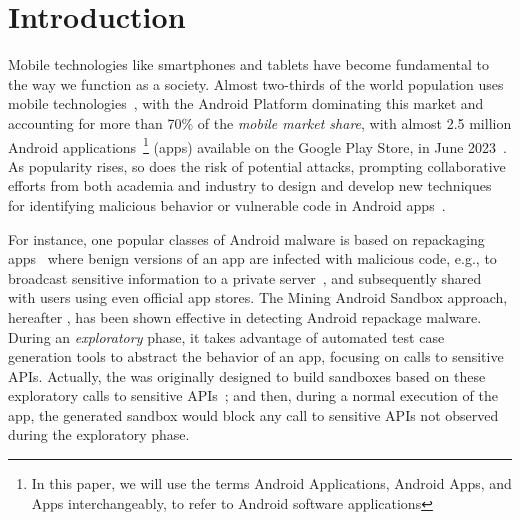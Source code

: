 \section{Introduction}\label{sec:introduction}

Mobile technologies like smartphones and tablets have become fundamental to the way we function as a society. Almost two-thirds of the world population
uses mobile technologies~\cite{Comscore,DBLP:journals/tse/MartinSJZH17}, with the
Android Platform dominating this market and accounting for more than 70\% of the \emph{mobile
market share}, with almost 2.5 million Android applications~\footnote{In this paper, we will use the terms Android Applications, Android Apps, and Apps interchangeably, to refer to Android software applications} (apps)
available on the Google Play Store, in June 2023~\cite{Statista}.  
As popularity rises, so does the risk of potential attacks, prompting collaborative efforts from both academia and industry to design and develop new techniques for identifying malicious behavior or vulnerable code in Android apps~\cite{10.1145/3017427}.

For instance, one popular classes of Android malware is based on repackaging apps~\cite{DBLP:conf/wcre/BaoLL18,le2018towards} where benign
versions of an app are
infected with malicious code, e.g., to broadcast
sensitive information to a private server~\cite{DBLP:journals/tse/LiBK21}, and subsequently shared
with users using even official app stores. The Mining Android Sandbox approach, hereafter \mas, has been shown effective
in detecting Android repackage malware. 
During an \emph{exploratory} phase, it takes advantage of automated test case generation tools to abstract the behavior of an app, focusing on calls to sensitive APIs. Actually, the \mas was originally designed to build sandboxes based on these exploratory calls to sensitive APIs~\cite{DBLP:conf/icse/JamrozikSZ16}; and then, during a normal execution of the app, the generated sandbox would block any call to sensitive APIs not observed during the exploratory phase. 

